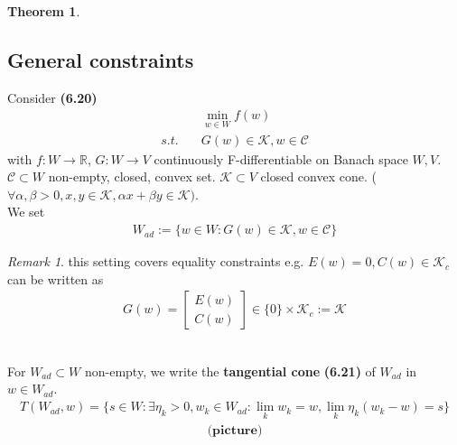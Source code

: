 \documentclass[a4paper,11pt,fleqn]{book}
\newtheorem{theorem}{Theorem}[section]
\theoremstyle{definition}
\theoremstyle{remark}
\newtheorem*{remark}{Remark}
\begin{document}
\begin{theorem}
	
\end{theorem}


\subsection{General constraints}
Consider  \textbf{(6.20)}
\begin{align*}
	&\min_{w \in W} f(w) \\
	s.t.\quad &G(w) \in \mathcal{K}, w \in \mathcal{C} 
\end{align*}
with $f:W \rightarrow \mathbb{R}$, $G: W \rightarrow V$ continuously F-differentiable on Banach space $W, V$. $\mathcal{C} \subset W$ non-empty, closed, convex set. $\mathcal{K} \subset V$ closed convex cone. ($\forall \alpha, \beta > 0, x, y \in \mathcal{K}, \alpha x + \beta y \in \mathcal{K})$. \\
We set
\begin{align*}
	W_{ad}:= \{ w \in W: G(w) \in \mathcal{K}, w \in \mathcal{C}\}
\end{align*}
\begin{remark}
this setting covers equality constraints e.g. $E(w) = 0, C(w) \in \mathcal{K}_c$ can be written as 
\begin{align*}
	G(w) = 
	\begin{bmatrix}
		E(w)\\
		C(w)
	\end{bmatrix}
	\in  \{0\} \times \mathcal{K}_c:= \mathcal{K}
\end{align*}	
\end{remark}
\quad\\
For $W_{ad} \subset W$ non-empty, we write the \textbf{tangential cone} \textbf{(6.21)} of $W_{ad}$ in $w \in W_{ad}$.
\begin{align*}
	T(W_{ad}, w) = \{ s \in W: \exists \eta_k > 0, w_k \in W_{ad}: \lim_k w_k = w, \lim_k \eta_k(w_k - w) = s \}
\end{align*}
\begin{align*}
	\textbf{(picture)}
\end{align*}
\end{document}
